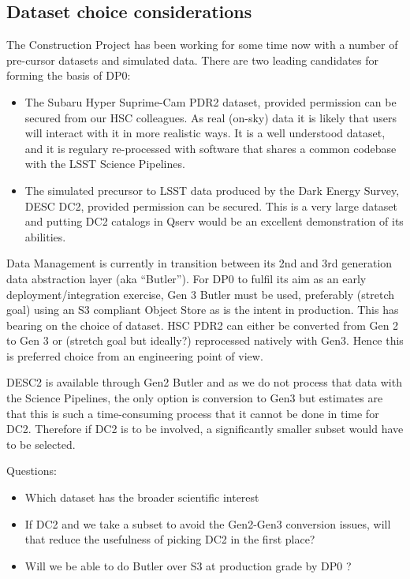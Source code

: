 \subsection {Dataset choice considerations} \label{sec:dataset}

The Construction Project has been working for some time now with a number of pre-cursor datasets and simulated data. There are two leading candidates for forming the basis of DP0:

\begin{itemize}
  
\item The Subaru Hyper Suprime-Cam PDR2 dataset, provided permission can be secured from our HSC colleagues. As real (on-sky) data it is likely that users will interact with it in more realistic ways. It is a well understood dataset, and it is regulary re-processed with software that shares a common codebase with the LSST Science Pipelines. 

\item The simulated precursor to LSST data produced by the Dark Energy Survey, DESC DC2, provided permission can be secured. This is a very large dataset and putting DC2 catalogs in Qserv would be an excellent demonstration of its abilities.

\end{itemize}

Data Management is currently in transition between its 2nd and 3rd generation data abstraction layer (aka ``Butler''). For DP0 to fulfil its aim as an early deployment/integration exercise, Gen 3 Butler must be used, preferably (stretch goal) using an S3 compliant Object Store as is the intent in production. This has bearing on the choice of dataset. HSC PDR2 can either be converted from Gen 2 to Gen 3 or (stretch goal but ideally?) reprocessed natively with Gen3. Hence this is preferred choice from an engineering point of view. 

DESC2 is available through Gen2 Butler and as we do not process that data with the Science Pipelines, the only option is conversion to Gen3 but estimates are that this is such a time-consuming process that it cannot be done in time for DC2. Therefore if DC2 is to be involved, a significantly smaller subset would have to be selected. 

Questions:

\begin{itemize}
  
\item Which dataset has the broader scientific interest

\item If DC2 and we take a subset to avoid the Gen2-Gen3 conversion issues, will that reduce the usefulness of picking DC2 in the first place?

\item Will we be able to do Butler over S3 at production grade by DP0 ? 

\end{itemize}

